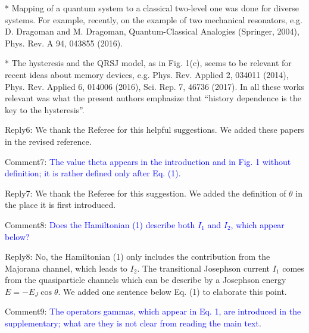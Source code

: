 \documentclass[onecolumn,preprintnumbers,amsmath,amssymb,prb]{revtex4}
\newcommand{\blue}[1]{\textcolor{blue}{#1}}
\begin{document}
* Mapping of a quantum system to a classical two-level one was done
for diverse systems. For example, recently, on the example of two
mechanical resonators, e.g. D. Dragoman and M. Dragoman,
Quantum-Classical Analogies (Springer, 2004), Phys. Rev. A 94, 043855
(2016).

* The hysteresis and the QRSJ model, as in Fig. 1(c), seems to be
relevant for recent ideas about memory devices, e.g. Phys. Rev.
Applied 2, 034011 (2014), Phys. Rev. Applied 6, 014006 (2016), Sci.
Rep. 7, 46736 (2017). In all these works relevant was what the present
authors emphasize that “history dependence is the key to the
hysteresis”.

\vspace{5mm}


\noindent Reply6: We thank the Referee for this helpful suggestions. We added these papers in the revised reference. 

\vspace{5mm}

\noindent Comment7:
\blue{The value theta appears in the introduction and in Fig. 1 without
definition; it is rather defined only after Eq. (1).}

\vspace{5mm}


\noindent Reply7: We thank the Referee for this suggestion. We added the definition of $\theta$ in the place it is first introduced.


\vspace{5mm}

\noindent Comment8:
\blue{Does the Hamiltonian (1) describe both $I_{1}$ and $I_{2}$, which appear
below?}

\vspace{5mm}


\noindent Reply8: No, the Hamiltonian (1) only includes the contribution from the Majorana channel, which leads to $I_2$. The transitional Josephson current $I_1$ comes from the quasiparticle channels which can be describe by a Josephson energy $E = -E_J \cos \theta$. We added one sentence below Eq. (1) to elaborate this point.

\vspace{5mm}

\noindent Comment9:
\blue{The operators gammas, which appear in Eq. 1, are introduced in the
supplementary; what are they is not clear from reading the main text.}

\vspace{5mm}
\end{document}
